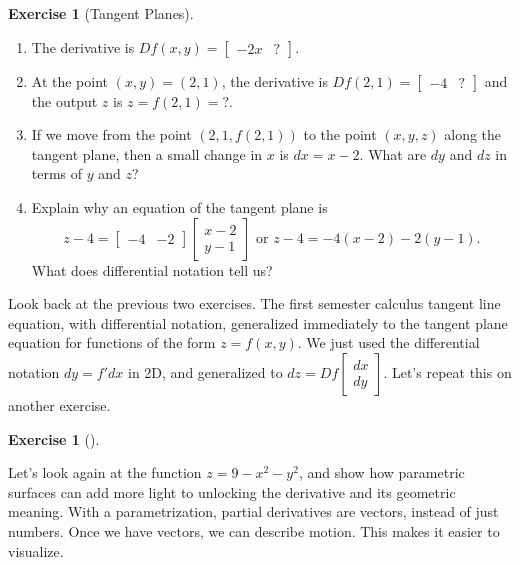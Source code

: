 \documentclass[10pt,]{book}
\theoremstyle{plain}
\theoremstyle{definition}
\theoremstyle{definition}
\theoremstyle{definition}
\theoremstyle{definition}
\newtheorem{exploration}[project]{Exercise}
\theoremstyle{definition}
\numberwithin{equation}{section}
\newcommand{\amp}{&}
\begin{document}
\begin{exploration}[Tangent Planes]\label{prob_tangent_plane_downbowl}
\leavevmode%
\begin{enumerate}[font=\bfseries,label=(\alph*),ref=\alph*]
\item\label{task-319} The derivative is \(Df(x,y) = \begin{bmatrix}-2x\amp ?
\end{bmatrix}\).%
\item\label{task-320} At the point \((x,y)=(2,1)\), the derivative is \(Df(2,1) = \begin{bmatrix}-4\amp ?
\end{bmatrix}\) and the output \(z\) is \(z=f(2,1)=?\).%
\item\label{task-321} If we move from the point \((2,1,f(2,1))\) to the point \((x,y,z)\) along the tangent plane, then a small change in \(x\) is \(dx=x-2\). What are \(dy\) and \(dz\) in terms of \(y\) and \(z\)?%
\item\label{task-322} Explain why an equation of the tangent plane is  %
\begin{equation*}
z-4=\begin{bmatrix}-4 \amp  -2
\end{bmatrix} \begin{bmatrix}x-2\\y-1
\end{bmatrix}  
\text{ or }  
z-4=-4(x-2)-2(y-1).
\end{equation*}
What does differential notation tell us?%
%
\end{enumerate}
\end{exploration}
Look back at the previous two exercises. The first semester calculus tangent line equation, with differential notation, generalized immediately to the tangent plane equation for functions of the form \(z=f(x,y)\). We just used the differential notation \(dy=f'dx\) in 2D, and generalized to \(dz = Df \begin{bmatrix}dx\\dy
\end{bmatrix}\). Let's repeat this on another exercise.%
\begin{exploration}[]\label{exploration-145}
\end{exploration}
Let's look again at the function \(z=9-x^2-y^2\), and show how parametric surfaces can add more light to unlocking the derivative and its geometric meaning. With a parametrization, partial derivatives are vectors, instead of just numbers. Once we have vectors, we can describe motion. This makes it easier to visualize.%
\end{document}
